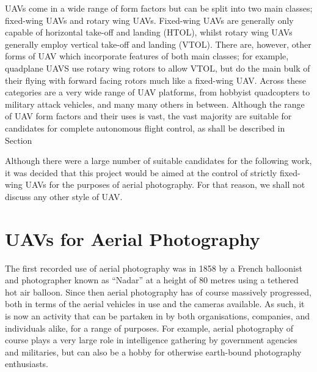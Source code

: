 UAVs come in a wide range of form factors but can be split into two main classes; fixed-wing UAVs and rotary wing UAVs. Fixed-wing UAVs are generally only capable of horizontal take-off and landing (HTOL), whilst rotary wing UAVs generally employ vertical take-off and landing (VTOL). There are, however, other forms of UAV which incorporate features of both main classes; for example, quadplane UAVS use rotary wing rotors to allow VTOL, but do the main bulk of their flying with forward facing rotors much like a fixed-wing UAV. Across these categories are a very wide range of UAV platforms, from hobbyist quadcopters to military attack vehicles, and many many others in between. %
Although the range of UAV form factors and their uses is vast, the vast majority are suitable for candidates for complete autonomous flight control, as shall be described in Section %
 
Although there were a large number of suitable candidates for the following work, it was decided that this project would be aimed at the control of strictly fixed-wing UAVs for the purposes of aerial photography. For that reason, we shall not discuss any other style of UAV. %

\section{UAVs for Aerial Photography} 
\label{intro:photography}

The first recorded use of aerial photography was in 1858 by a French balloonist and photographer known as ``Nadar'' at a height of 80 metres using a tethered hot air balloon. %
Since then aerial photography has of course massively progressed, both in terms of the aerial vehicles in use and the cameras available. As such, it is now an activity that can be partaken in by both organisations, companies, and individuals alike, for a range of purposes. For example, aerial photography of course plays a very large role in intelligence gathering by government agencies and militaries, but can also be a hobby for otherwise earth-bound photography enthusiasts. 

